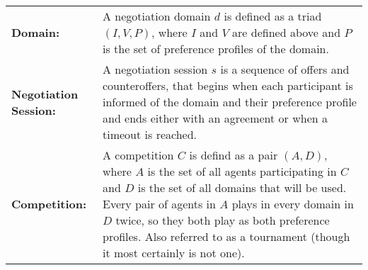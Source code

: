 \begin{longtable}{l p{290pt}}
                \textbf{Domain:} & A negotiation domain $d$ is defined as a triad $(I, V, P)$, where $I$ and $V$ are defined above and $P$ is the set of preference profiles of the domain\protect\footnotemark.\\

                \textbf{Negotiation Session:} & A negotiation session $s$ is a sequence of offers and counteroffers, that begins when each participant is informed of the domain and their preference profile and ends either with an agreement or when a timeout is reached. \\

                \textbf{Competition:} & A competition $C$ is defind as a pair $(A, D)$, where $A$ is the set of all agents participating in $C$ and $D$ is the set of all domains that will be used. Every pair of agents in $A$ plays in every domain in $D$ twice, so they both play as both preference profiles. Also referred to as a tournament (though it most certainly is not one).\\	%

        \end{longtable}

